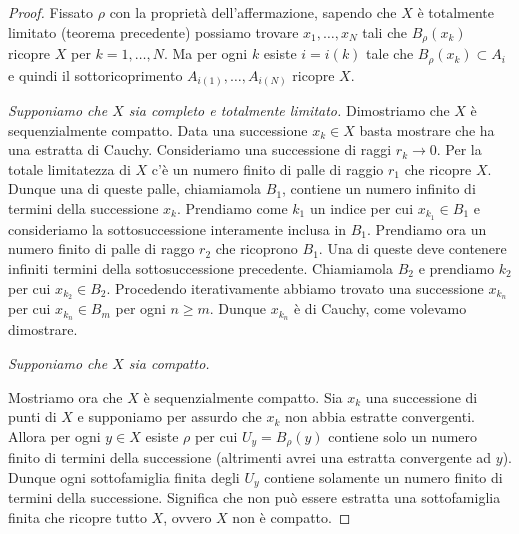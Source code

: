 \begin{proof}
Fissato $\rho$ con la proprietà dell'affermazione,
sapendo che $X$ è totalmente limitato (teorema precedente) 
possiamo trovare $x_1, \dots, x_N$ tali che 
$B_\rho(x_k)$ ricopre $X$ per $k=1,\dots,N$. 
Ma per ogni $k$ esiste $i=i(k)$ tale che $B_\rho(x_k)\subset A_i$ 
e quindi il sottoricoprimento $A_{i(1)}, \dots, A_{i(N)}$
ricopre $X$.

\emph{Supponiamo che $X$ sia completo e totalmente limitato.}
Dimostriamo che $X$ è sequenzialmente compatto.
Data una successione $x_k\in X$ basta mostrare che ha una estratta di Cauchy.
Consideriamo una successione di raggi $r_k\to 0$. 
Per la totale limitatezza di $X$ c'è un numero finito di palle di raggio $r_1$ 
che ricopre $X$. 
Dunque una di queste palle, chiamiamola $B_1$, 
contiene un numero infinito di termini 
della successione $x_k$. 
Prendiamo come $k_1$ un indice per cui $x_{k_1} \in B_1$
e consideriamo la sottosuccessione interamente inclusa in $B_1$.
Prendiamo ora un numero finito di palle di raggo $r_2$ che ricoprono $B_1$.
Una di queste deve contenere infiniti termini della sottosuccessione precedente.
Chiamiamola $B_2$ e prendiamo $k_2$ per cui $x_{k_2}\in B_2$.
Procedendo iterativamente abbiamo trovato una successione $x_{k_n}$ per cui 
$x_{k_n} \in B_m$ per ogni $n\ge m$. 
Dunque $x_{k_n}$ è di Cauchy, come volevamo dimostrare.

\emph{Supponiamo che $X$ sia compatto.}


Mostriamo ora che $X$ è sequenzialmente compatto.
Sia $x_k$ una successione di punti di $X$
e supponiamo per assurdo che $x_k$ non abbia estratte 
convergenti.
Allora per ogni $y\in X$ esiste $\rho$ 
per cui $U_y = B_\rho(y)$ contiene solo un numero finito 
di termini della successione (altrimenti avrei una estratta 
convergente ad $y$).
Dunque ogni sottofamiglia finita degli $U_y$ contiene 
solamente un numero finito di termini della successione.
Significa che non può essere estratta una sottofamiglia 
finita che ricopre tutto $X$, ovvero $X$ non è compatto.

\end{proof}

